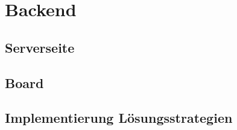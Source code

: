 
\chapter{Backend}

\section{Serverseite}

\section{Board}

\section{Implementierung Lösungsstrategien}

